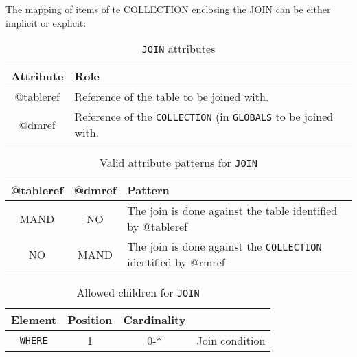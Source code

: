 The mapping of items of te COLLECTION enclosing the JOIN can be either implicit or explicit:

\begin{table}[!htbp]
\small
\centering
\begin{tabulary}{\linewidth}{|c|J|}       
       \hline 
            \textbf{Attribute} & 
            \textbf {Role}\\
       \hline         \hline  
             @tableref& 
            Reference of the table to be joined with. \\
        \hline 
            @dmref & 
            Reference of the \texttt{COLLECTION} (in \texttt{GLOBALS} to be joined with. \\
        \hline 
     \end{tabulary}
     \caption{\texttt{JOIN} attributes} 
     \label{tbl:join-att}
 \end{table}

\begin{table}[!htbp]
\small
\centering
\begin{tabulary}{\linewidth}{|c|c|J|}
    \hline 
        \textbf{@tableref} &
        \textbf{@dmref} &
        \textbf{Pattern}\\
    \hline      \hline  
        MAND &           
        NO &           
        The join is done against the table identified by @tableref \\
    \hline   
        NO &           
        MAND &           
        The join is done against the \texttt{COLLECTION} identified by @rmref \\
   \hline 
\end{tabulary}
     \caption{Valid attribute patterns for  \texttt{JOIN}}
     \label{tbl:join-pattern}
\end{table}


\begin{table}[!htbp]
\small
\centering
\begin{tabulary}{\linewidth}{|c |c |c|J|}
    \hline 
        \textbf{Element} &
        \textbf{Position} &
        \textbf{Cardinality} &
        \\
    \hline      \hline  
        \texttt{WHERE}  &        
        1 &           
        0-* &
         Join condition\\
    \hline 
\end{tabulary}
     \caption{Allowed children for \texttt{JOIN}} 
     \label{tbl:join-chilren}
 \end{table}